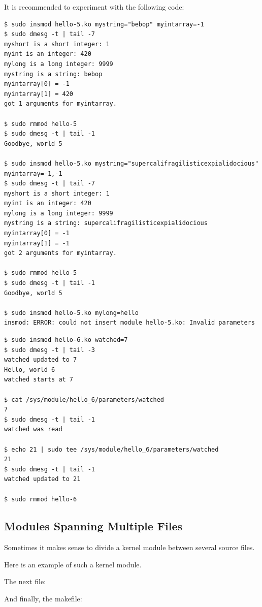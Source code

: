 \documentclass[10pt, oneside]{book}
\begin{document}
It is recommended to experiment with the following code:
\begin{verbatim}
$ sudo insmod hello-5.ko mystring="bebop" myintarray=-1
$ sudo dmesg -t | tail -7
myshort is a short integer: 1
myint is an integer: 420
mylong is a long integer: 9999
mystring is a string: bebop
myintarray[0] = -1
myintarray[1] = 420
got 1 arguments for myintarray.

$ sudo rmmod hello-5
$ sudo dmesg -t | tail -1
Goodbye, world 5

$ sudo insmod hello-5.ko mystring="supercalifragilisticexpialidocious" myintarray=-1,-1
$ sudo dmesg -t | tail -7
myshort is a short integer: 1
myint is an integer: 420
mylong is a long integer: 9999
mystring is a string: supercalifragilisticexpialidocious
myintarray[0] = -1
myintarray[1] = -1
got 2 arguments for myintarray.

$ sudo rmmod hello-5
$ sudo dmesg -t | tail -1
Goodbye, world 5

$ sudo insmod hello-5.ko mylong=hello
insmod: ERROR: could not insert module hello-5.ko: Invalid parameters
\end{verbatim}

\begin{verbatim}
$ sudo insmod hello-6.ko watched=7
$ sudo dmesg -t | tail -3
watched updated to 7
Hello, world 6
watched starts at 7

$ cat /sys/module/hello_6/parameters/watched
7
$ sudo dmesg -t | tail -1
watched was read

$ echo 21 | sudo tee /sys/module/hello_6/parameters/watched
21
$ sudo dmesg -t | tail -1
watched updated to 21

$ sudo rmmod hello-6
\end{verbatim}

\subsection{Modules Spanning Multiple Files}
\label{sec:modfiles}
Sometimes it makes sense to divide a kernel module between several source files.

Here is an example of such a kernel module.

The next file:

And finally, the makefile:

\end{document}
